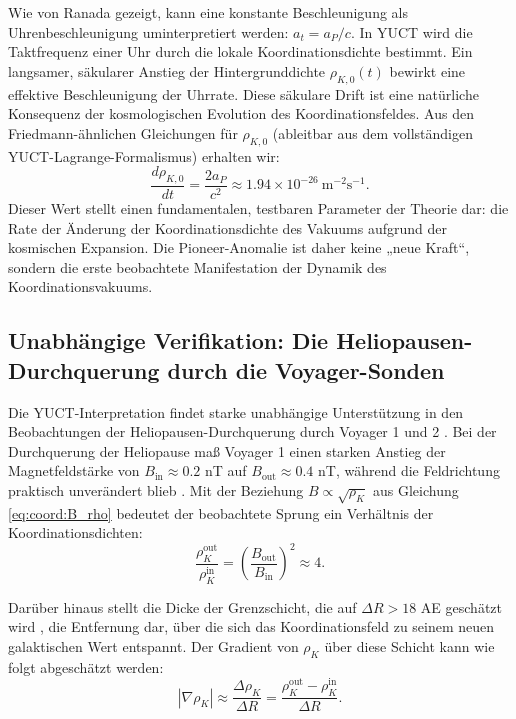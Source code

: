 \documentclass[12pt,a4paper]{article}
\theoremstyle{remark}
\begin{document}
	Wie von Ranada \cite{Ranada2005} gezeigt, kann eine konstante Beschleunigung als Uhrenbeschleunigung uminterpretiert werden: $a_t = a_P / c$. In YUCT wird die Taktfrequenz einer Uhr durch die lokale Koordinationsdichte bestimmt. Ein langsamer, säkularer Anstieg der Hintergrunddichte $\rho_{K,0}(t)$ bewirkt eine effektive Beschleunigung der Uhrrate. Diese säkulare Drift ist eine natürliche Konsequenz der kosmologischen Evolution des Koordinationsfeldes. Aus den Friedmann-ähnlichen Gleichungen für $\rho_{K,0}$ (ableitbar aus dem vollständigen YUCT-Lagrange-Formalismus) erhalten wir:
	\begin{equation}
		\frac{d\rho_{K,0}}{dt} = \frac{2a_P}{c^2} \approx 1.94 \times 10^{-26}\ \text{m}^{-2}\text{s}^{-1}.
		\label{eq:coord:rho_dot}
	\end{equation}
	Dieser Wert stellt einen fundamentalen, testbaren Parameter der Theorie dar: die Rate der Änderung der Koordinationsdichte des Vakuums aufgrund der kosmischen Expansion. Die Pioneer-Anomalie ist daher keine „neue Kraft“, sondern die erste beobachtete Manifestation der Dynamik des Koordinationsvakuums.
	
	\subsection{Unabhängige Verifikation: Die Heliopausen-Durchquerung durch die Voyager-Sonden}
	\label{subsec:coord:voyager}
	
	Die YUCT-Interpretation findet starke unabhängige Unterstützung in den Beobachtungen der Heliopausen-Durchquerung durch Voyager 1 und 2 \cite{Burlaga2013}. Bei der Durchquerung der Heliopause maß Voyager 1 einen starken Anstieg der Magnetfeldstärke von $B_{\text{in}} \approx 0.2$ nT auf $B_{\text{out}} \approx 0.4$ nT, während die Feldrichtung praktisch unverändert blieb \cite{Burlaga2013}. Mit der Beziehung $B \propto \sqrt{\rho_K}$ aus Gleichung \eqref{eq:coord:B_rho} bedeutet der beobachtete Sprung ein Verhältnis der Koordinationsdichten:
	\begin{equation}
		\frac{\rho_K^{\text{out}}}{\rho_K^{\text{in}}} = \left( \frac{B_{\text{out}}}{B_{\text{in}}} \right)^2 \approx 4.
		\label{eq:coord:rho_ratio_voyager}
	\end{equation}
	
	Darüber hinaus stellt die Dicke der Grenzschicht, die auf $\Delta R > 18$ AE geschätzt wird \cite{Richardson2024}, die Entfernung dar, über die sich das Koordinationsfeld zu seinem neuen galaktischen Wert entspannt. Der Gradient von $\rho_K$ über diese Schicht kann wie folgt abgeschätzt werden:
	\begin{equation}
		|\nabla \rho_K| \approx \frac{\Delta \rho_K}{\Delta R} = \frac{\rho_K^{\text{out}} - \rho_K^{\text{in}}}{\Delta R}.
		\label{eq:coord:gradient_estimate}
	\end{equation}
	
\end{document}

